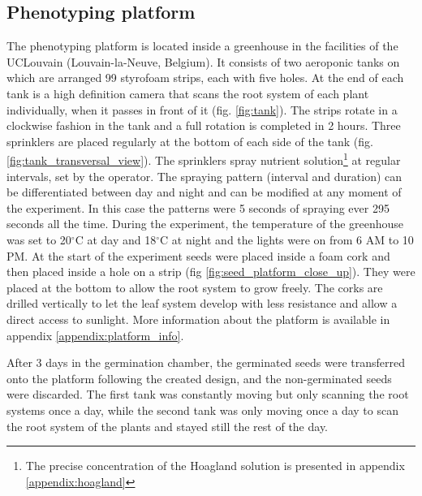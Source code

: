 \subsection{Phenotyping platform}
The phenotyping platform is located inside a greenhouse in the facilities of the UCLouvain (Louvain-la-Neuve, Belgium). 
It consists of two aeroponic tanks on which are arranged 99 styrofoam strips, each with five holes. 
At the end of each tank is a high definition camera that scans the root system of each plant individually, when it passes in 
front of it (fig. \ref{fig:tank}). 
The strips rotate in a clockwise fashion in the tank and a full rotation is completed in 2 hours. 
Three sprinklers are placed regularly at the bottom of each side of the tank (fig. \ref{fig:tank_transversal_view}). 
The sprinklers spray nutrient solution\footnote{The precise concentration of the Hoagland solution is presented in appendix 
\ref{appendix:hoagland}} at regular intervals, set by the operator. 
The spraying pattern (interval and duration) can be differentiated between day and night and can be modified at any moment of 
the experiment.
In this case the patterns were 5 seconds of spraying ever 295 seconds all the time.
During the experiment, the temperature of the greenhouse was set to 20$^{\circ}$C at day and 18$^{\circ}$C at night and the 
lights were on from 6 AM to 10 PM. 
At the start of the experiment seeds were placed inside a foam cork and then placed inside a hole on a strip (fig 
\ref{fig:seed_platform_close_up}). 
They were placed at the bottom to allow the root system to grow freely. 
The corks are drilled vertically to let the leaf system develop with less resistance and allow a direct access to sunlight. 
More information about the platform is available in appendix \ref{appendix:platform_info}.

After 3 days in the germination chamber, the germinated seeds were transferred onto the platform following the created design, and the non-germinated seeds were discarded. The first tank was constantly moving but only scanning the root systems once a day, while the second tank was only moving once a day to scan the root system of the plants and stayed still the rest of the day.

